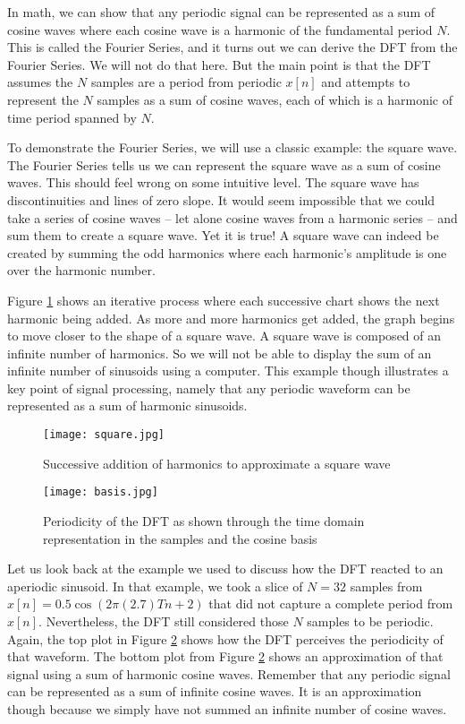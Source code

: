 In math, we can show that any periodic signal can be
represented as a sum of cosine waves where each cosine wave is a harmonic of the fundamental period $N$.  
This is called the Fourier Series, and it turns out we can derive the DFT from the Fourier Series.  We will not
do that here.  But the main point is that the DFT assumes the $N$ samples are a period from periodic $x[n]$ and 
attempts to
represent the $N$ samples as a sum of cosine waves, each of which is a harmonic of time period spanned by $N$.  

To demonstrate the Fourier Series, we will use a classic example: the square wave.  The Fourier Series tells us we
can represent the square wave as a sum of cosine waves.  This should feel wrong on some intuitive level.  The
square wave has discontinuities and lines of zero slope.  It would seem impossible that we could take a series of
cosine waves -- let alone cosine waves from a harmonic series -- and sum them to create a square wave.  Yet it is 
true!  A square
wave can indeed be created by summing the odd harmonics where each harmonic's amplitude is one over 
the harmonic number.

Figure \ref{fig:square} shows an iterative process where each successive chart shows the next harmonic being
added.  As more and more harmonics get added, the graph begins to move closer to the shape of a square wave.  A
square wave is composed of an infinite number of harmonics.  So we will not be able to display the sum of an infinite
number of sinusoids using a computer.  This example though illustrates a key point of signal processing, namely that any
periodic waveform can be represented as a sum of harmonic sinusoids.  

\begin{figure}[h]
	\caption{Successive addition of harmonics to approximate a square wave}
	\label{fig:square}
	\begin{center}
		\texttt{[image: square.jpg]}
	\end{center}
\end{figure}

\begin{figure}[h]
	\caption{Periodicity of the DFT as shown through the time domain representation in the samples and the cosine basis}
	\label{fig:basis}
	\begin{center}
		\texttt{[image: basis.jpg]}
	\end{center}
\end{figure}

Let us look back at the example we used to discuss how the DFT reacted to an aperiodic sinusoid.  In that example,
we took a slice of $N = 32$ samples from $x[n] = 0.5\cos(2\pi (2.7)Tn + 2)$ that did not capture a complete period
from $x[n]$.  Nevertheless, the DFT still considered those $N$ samples to be periodic.  Again, the top
plot in Figure \ref{fig:basis} shows how the DFT perceives the periodicity of that waveform.  
The bottom plot from Figure \ref{fig:basis} shows an approximation of that signal using a sum of harmonic cosine
waves.  Remember that any periodic signal can be represented as a sum of infinite cosine waves.  It is an approximation
though because we simply have not summed an infinite number of cosine waves.


